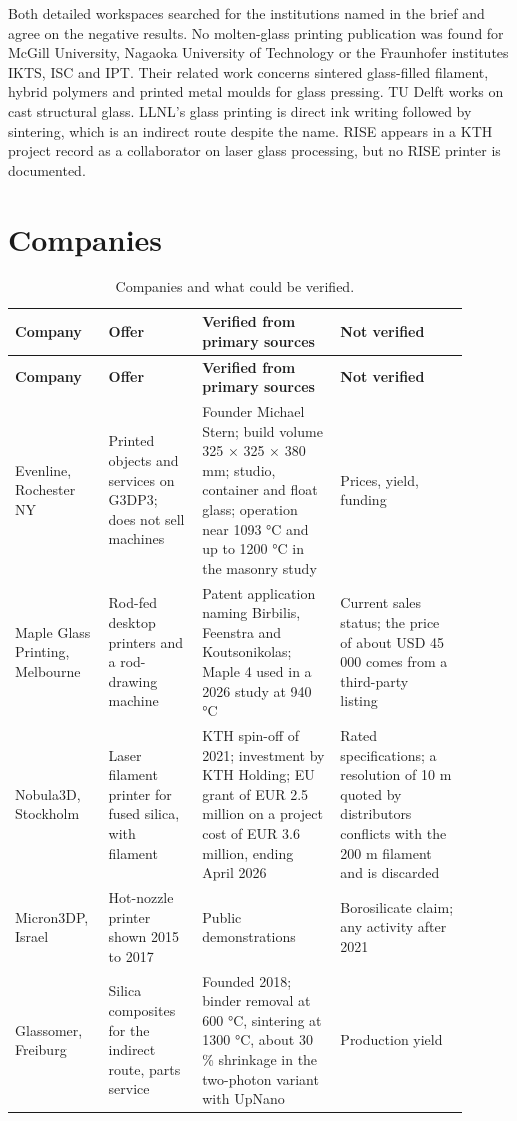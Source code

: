 \documentclass[10pt,a4paper]{article}
\begin{document}
Both detailed workspaces searched for the institutions named in the brief and agree on the negative results. No molten-glass printing publication was found for McGill University, Nagaoka University of Technology or the Fraunhofer institutes IKTS, ISC and IPT. Their related work concerns sintered glass-filled filament, hybrid polymers and printed metal moulds for glass pressing. TU Delft works on cast structural glass. LLNL's glass printing is direct ink writing followed by sintering, which is an indirect route despite the name. RISE appears in a KTH project record as a collaborator on laser glass processing, but no RISE printer is documented.

\section{Companies}

{\footnotesize
\begin{longtable}{@{}L{0.162\linewidth}L{0.190\linewidth}L{0.286\linewidth}L{0.267\linewidth}@{}}
  \caption{Companies and what could be verified.}\label{tbl:companies}\\
  \toprule
  \textbf{Company} & \textbf{Offer} & \textbf{Verified from primary sources} & \textbf{Not verified} \\
  \midrule
  \endfirsthead
  \toprule
  \textbf{Company} & \textbf{Offer} & \textbf{Verified from primary sources} & \textbf{Not verified} \\
  \midrule
  \endhead
    Evenline, Rochester NY & Printed objects and services on G3DP3; does not sell machines & Founder Michael Stern; build volume 325 × 325 × 380 mm; studio, container and float glass; operation near 1093 °C and up to 1200 °C in the masonry study~\citep{evenline_web,mit2024masonry} & Prices, yield, funding \\
    Maple Glass Printing, Melbourne & Rod-fed desktop printers and a rod-drawing machine & Patent application naming Birbilis, Feenstra and Koutsonikolas; Maple 4 used in a 2026 study at 940 °C~\citep{maple_patent,chhadeh2026toolpath} & Current sales status; the price of about USD 45 000 comes from a third-party listing~\citep{maple_aniwaa} \\
    Nobula3D, Stockholm & Laser filament printer for fused silica, with filament & KTH spin-off of 2021; investment by KTH Holding; EU grant of EUR 2.5 million on a project cost of EUR 3.6 million, ending April 2026~\citep{nobula_kthventures,nobula_cordis,kth2024microlens} & Rated specifications; a resolution of 10 \textmu{}m quoted by distributors conflicts with the 200 \textmu{}m filament and is discarded \\
    Micron3DP, Israel & Hot-nozzle printer shown 2015 to 2017 & Public demonstrations~\citep{micron3dp_acers} & Borosilicate claim; any activity after 2021 \\
    Glassomer, Freiburg & Silica composites for the indirect route, parts service & Founded 2018; binder removal at 600 °C, sintering at 1300 °C, about 30 \% shrinkage in the two-photon variant with UpNano~\citep{upnano2024} & Production yield \\
  \bottomrule
\end{longtable}
}
\end{document}
